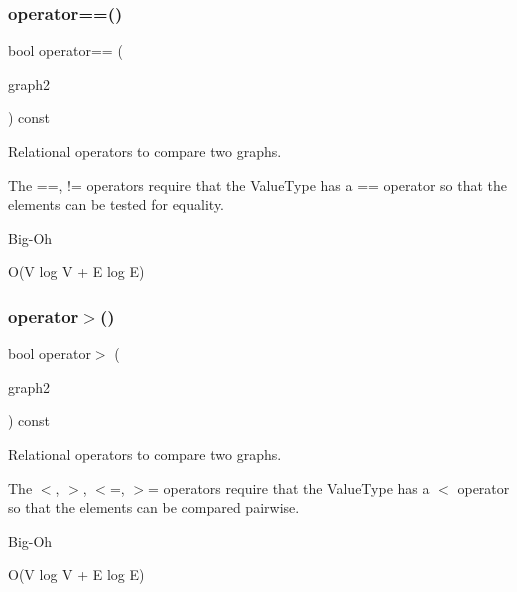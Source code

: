 \subsubsection{\texorpdfstring{operator==()}{operator==()}}
{\footnotesize\ttfamily bool operator== (\begin{DoxyParamCaption}\item[{const \mbox{\hyperlink{classGraph}{Graph}}$<$ \mbox{\hyperlink{classVertexGen}{Vertex\+Gen}}$<$ V, E $>$, Edge\+Gen$<$ V, E $>$ $>$ \&}]{graph2 }\end{DoxyParamCaption}) const\hspace{0.3cm}{\ttfamily [inherited]}}



Relational operators to compare two graphs. 

The ==, != operators require that the Value\+Type has a == operator so that the elements can be tested for equality. \begin{DoxyRefDesc}{Big-\/\+Oh}
\item[\mbox{\hyperlink{BigOh__BigOh000093}{Big-\/\+Oh}}]O(V log V + E log E) \end{DoxyRefDesc}
\mbox{\label{classGraph_a8019cf2c98949fd509193cf26ba2ff8a}} 
\subsubsection{\texorpdfstring{operator$>$()}{operator>()}}
{\footnotesize\ttfamily bool operator$>$ (\begin{DoxyParamCaption}\item[{const \mbox{\hyperlink{classGraph}{Graph}}$<$ \mbox{\hyperlink{classVertexGen}{Vertex\+Gen}}$<$ V, E $>$, Edge\+Gen$<$ V, E $>$ $>$ \&}]{graph2 }\end{DoxyParamCaption}) const\hspace{0.3cm}{\ttfamily [inherited]}}



Relational operators to compare two graphs. 

The $<$, $>$, $<$=, $>$= operators require that the Value\+Type has a $<$ operator so that the elements can be compared pairwise. \begin{DoxyRefDesc}{Big-\/\+Oh}
\item[\mbox{\hyperlink{BigOh__BigOh000097}{Big-\/\+Oh}}]O(V log V + E log E) \end{DoxyRefDesc}
\mbox{\label{classGraph_ab1ca2af20f3b0251972b72295270212e}} 
